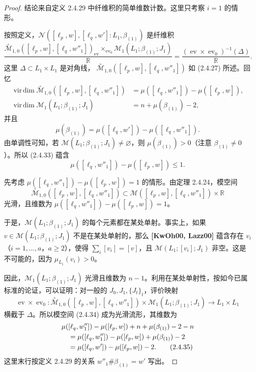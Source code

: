 \begin{proof}
结论来自定义 2.4.29 中纤维积的简单维数计数。这里只考察 $i=1$ 的情形。

按照定义，$\mathcal N([\ell_p,w],[\ell_q,w']:L_1,\beta_{(1)})$ 是纤维积
\begin{equation}
  \frac{
    \overset{\circ}{\mathcal M}_{1,0}
      ([\ell_p,w],[\ell_q,w''_1])_{\operatorname{ev}}
    \mathop{\times}_{\operatorname{ev}_0}
    \mathcal M_1(L_1;\beta_{(1)};J_1)}{\mathbb R}
  =\frac{(\operatorname{ev}\times\operatorname{ev}_0)^{-1}(\Delta)}{\mathbb R}.
  \tag{2.4.34}\label{eq:2-4-34}
\end{equation}
这里 $\Delta\subset L_1\times L_1$ 是对角线，
$\overset{\circ}{\mathcal M}_{1,0}([\ell_p,w],[\ell_q,w''_1])$ 如 (2.4.27) 所述。回忆
\begin{align*}
  \operatorname{vir\,dim}
  \overset{\circ}{\mathcal M}_{1,0}
    ([\ell_p,w],[\ell_q,w''_1])
    &=\mu([\ell_q,w''_1])-\mu([\ell_p,w]),\\
  \operatorname{vir\,dim}\mathcal M_1(L_1;\beta_{(1)};J_1)
    &=n+\mu(\beta_{(1)})-2,
\end{align*}
并且
\[
  \mu(\beta_{(1)})
  =\mu([\ell_q,w'])-\mu([\ell_q,w''_1]).
\]
由单调性可知，若 $\mathcal M(L_1;\beta_{(1)};J_1)\neq\varnothing$，则
$\mu(\beta_{(1)})>0$（注意 $\beta_{(1)}\neq0$）。所以 (2.4.33) 蕴含
\[
  \mu([\ell_q,w''_1])-\mu([\ell_p,w])\leq1.
\]

先考虑 $\mu([\ell_q,w''_1])-\mu([\ell_p,w])=1$ 的情形。由定理 2.4.24，模空间
\[
  \overset{\circ}{\mathcal M}_{1,0}
    ([\ell_p,w],[\ell_q,w''_1])
  \subset\mathcal M([\ell_p,w],[\ell_q,w''_1])\times\mathbb R
\]
光滑，且维数为
$\mu([\ell_q,w''_1])-\mu([\ell_p,w])=1$。

于是，$\mathcal M(L_1;\beta_{(1)};J_1)$ 的每个元素都在某处单射。事实上，如果
$v\in\mathcal M(L_1;\beta_{(1)};J_1)$ 不是在某处单射的，那么
\textbf{[KwOh00, Lazz00]} 蕴含存在 $v_i$（$i=1,\ldots,a$，$a\geq2$），使得
$\sum_i[v_i]=[v]$，且 $\mathcal M(L_1;[v_i];J_1)$ 非空。这是不可能的，因为
$\mu_{L_1}(v_i)>0$。

因此，$\mathcal M_1(L_1;\beta_{(1)};J_1)$ 光滑且维数为 $n-1$。利用在某处单射性，按如今已属标准的论证，可以证明：对一般的
$J_0,J_1,\{J_t\}_t$，评价映射
\[
  \operatorname{ev}\times\operatorname{ev}_0:
  \overset{\circ}{\mathcal M}_{1,0}
    ([\ell_p,w],[\ell_q,w''_1])
  \times\mathcal M_1(L_1;\beta_{(1)};J_1)
  \longrightarrow L_1\times L_1
\]
横截于 $\Delta$。所以模空间 (2.4.34) 成为光滑流形，其维数为
\begin{align}
 &\mu([\ell_q,w''_1])-\mu([\ell_p,w])+n+\mu(\beta_{(1)})-2-n\notag\\
 &\quad=\mu([\ell_q,w''_1])-\mu([\ell_p,w])+\mu(\beta_{(1)})-2\notag\\
 &\quad=\mu([\ell_q,w'])-\mu([\ell_p,w])-2.
 \tag{2.4.35}\label{eq:2-4-35}
\end{align}
这里末行按定义 2.4.29 的关系 $w''_1\#\beta_{(1)}=w'$ 写出。


\end{proof}

